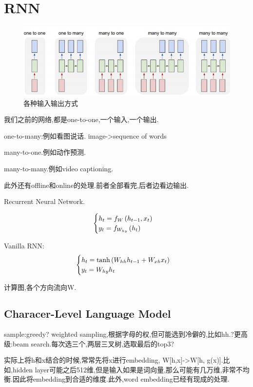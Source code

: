 \section{RNN}
	\begin{figure}[htbp]
		\centering
		\includegraphics[scale=0.65]{figures/rnn-seqdata.png}
		\caption{各种输入输出方式}
		\label{}
	\end{figure}
	我们之前的网络,都是one-to-one,一个输入,一个输出.
	
	one-to-many:例如看图说话. image->sequence of words
	
	many-to-one.例如动作预测.
	
	many-to-many.例如video captioning.
	
	此外还有offline和online的处理.前者全部看完,后者边看边输出.
	
	Recurrent Neural Network.
	
	\begin{equation}
		\begin{cases}
			h_t = f_W\left( h_{t-1}, x_t\right)
			\\
			y_t = f_{W_{hy}}\left( h_t\right)
		\end{cases}
	\end{equation}

	Vanilla RNN:
	\begin{equation}
		\begin{cases}
			h_t = \tanh\left( W_{hh}h_{t-1} + W_{xh}x_t\right)
			\\
			y_t = W_{hy}h_t
		\end{cases}
	\end{equation}

	计算图,各个方向流向W.
	
	\subsection{Characer-Level Language Model}
	sample:greedy? weighted sampling,根据字母的权,但可能选到冷僻的,比如hh.?更高级:beam search.每次选三个,两层三叉树,选取最后的top3?
	
	实际上将h和x结合的时候,常常先将x进行embedding, W[h,x]->W[h, g(x)].比如,hidden layer可能之后512维,但是输入如果是词向量,那么可能有几万维,非常不均衡.因此将embedding到合适的维度.此外,word embedding已经有现成的处理.
	
